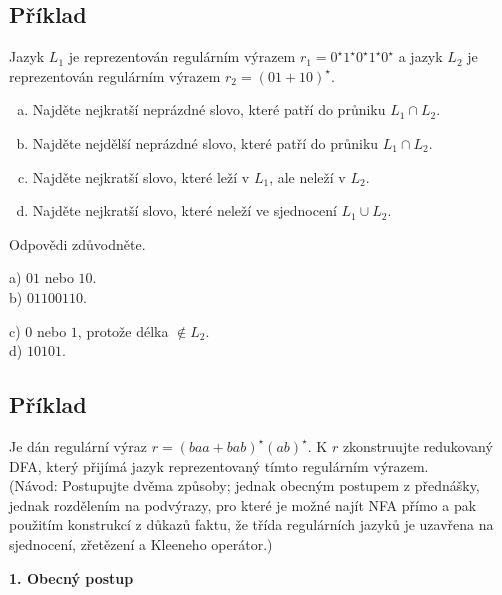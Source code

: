 \subsection{Příklad}
Jazyk $L_1$ je reprezentován regulárním výrazem $r_1 = 0^\star1^\star0^\star1^\star0^\star$ a jazyk $L_2$ je reprezentován 
regulárním výrazem $r_2 = (01 + 10)^\star$.
\begin{enumerate}[a), noitemsep]
    \item Najděte nejkratší neprázdné slovo, které patří do průniku $L_1 \cap L_2$.
    \item Najděte nejdělší neprázdné slovo, které patří do průniku $L_1 \cap L_2$.
    \item Najděte nejkratší slovo, které leží v $L_1$, ale neleží v $L_2$.
    \item Najděte nejkratší slovo, které neleží ve sjednocení $L_1 \cup L_2$.
\end{enumerate}
Odpovědi zdůvodněte.

\begin{multicols}{2}
    a) $01$ nebo $10$.\\
    b) $01100110$.
\columnbreak

    c) $0$ nebo $1$, protože délka $\not\in L_2$.\\
    d) $10101$.
\end{multicols}

\subsection{Příklad}
Je dán regulární výraz $r=(baa + bab)^\star (ab)^\star$. K $r$ zkonstruujte redukovaný DFA, který přijímá jazyk reprezentovaný tímto 
regulárním výrazem.\\
(Návod: Postupujte dvěma způsoby; jednak obecným postupem z přednášky, jednak rozdělením na podvýrazy, pro které je možné 
najít NFA přímo a pak použitím konstrukcí z důkazů faktu, že třída regulárních jazyků je uzavřena na sjednocení, zřetězení 
a Kleeneho operátor.)

\textbf{1. Obecný postup}

